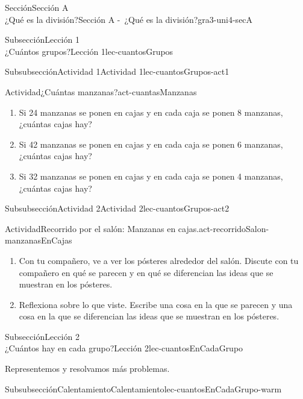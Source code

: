 \begin{sectionptx}{Sección}{{\Large Sección A\\}¿Qué es la división?}{}{Sección A -~¿Qué es la división?}{}{}{gra3-uni4-secA}
\begin{subsectionptx}{Subsección}{{\normalsize Lección 1\\[-0.05cm]}¿Cuántos grupos?}{}{Lección 1}{}{}{lec-cuantosGrupos}
\begin{subsubsectionptx}{Subsubsección}{Actividad 1}{}{Actividad 1}{}{}{lec-cuantosGrupos-act1}
\begin{activity}{Actividad}{¿Cuántas manzanas?}{act-cuantasManzanas}
%
\begin{enumerate}
\item{}Si 24 manzanas se ponen en cajas y en cada caja se ponen 8 manzanas, ¿cuántas cajas hay?%
\item{}Si 42 manzanas se ponen en cajas y en cada caja se ponen 6 manzanas, ¿cuántas cajas hay?%
\item{}Si 32 manzanas se ponen en cajas y en cada caja se ponen 4 manzanas, ¿cuántas cajas hay?%
\end{enumerate}
%
\end{activity}%
\end{subsubsectionptx}
%
%
\typeout{************************************************}
\typeout{************************************************}
%
\begin{subsubsectionptx}{Subsubsección}{Actividad 2}{}{Actividad 2}{}{}{lec-cuantosGrupos-act2}
\begin{activity}{Actividad}{Recorrido por el salón: Manzanas en cajas.}{act-recorridoSalon-manzanasEnCajas}%
%
\begin{enumerate}
\item{}Con tu compañero, ve a ver los pósteres alrededor del salón. Discute con tu compañero en qué se parecen y en qué se diferencian las ideas que se muestran en los pósteres.%
\item{}Reflexiona sobre lo que viste. Escribe una cosa en la que se parecen y una cosa en la que se diferencian las ideas que se muestran en los pósteres.%
\end{enumerate}
%
\end{activity}%
\end{subsubsectionptx}
\end{subsectionptx}
%
%
\typeout{************************************************}
\typeout{************************************************}
%
\begin{subsectionptx}{Subsección}{{\normalsize Lección 2\\[-0.05cm]}¿Cuántos hay en cada grupo?}{}{Lección 2}{}{}{lec-cuantosEnCadaGrupo}
\begin{introduction}{}%
Representemos y resolvamos más problemas.%
\end{introduction}%
%
%
\typeout{************************************************}
\typeout{************************************************}
%
\begin{subsubsectionptx}{Subsubsección}{Calentamiento}{}{Calentamiento}{}{}{lec-cuantosEnCadaGrupo-warm}

\end{subsubsectionptx}
\end{subsectionptx}
\end{sectionptx}
